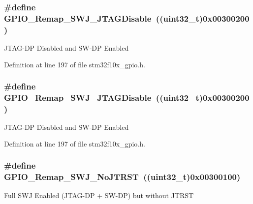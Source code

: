 \subsubsection[{\texorpdfstring{G\+P\+I\+O\+\_\+\+Remap\+\_\+\+S\+W\+J\+\_\+\+J\+T\+A\+G\+Disable}{GPIO_Remap_SWJ_JTAGDisable}}]{\setlength{\rightskip}{0pt plus 5cm}\#define G\+P\+I\+O\+\_\+\+Remap\+\_\+\+S\+W\+J\+\_\+\+J\+T\+A\+G\+Disable~(({\bf uint32\+\_\+t})0x00300200)}\hypertarget{group___g_p_i_o___remap__define_ga25fb8c789334694861444e48f486879d}{}\label{group___g_p_i_o___remap__define_ga25fb8c789334694861444e48f486879d}
J\+T\+A\+G-\/\+DP Disabled and S\+W-\/\+DP Enabled 

Definition at line 197 of file stm32f10x\+\_\+gpio.\+h.

\subsubsection[{\texorpdfstring{G\+P\+I\+O\+\_\+\+Remap\+\_\+\+S\+W\+J\+\_\+\+J\+T\+A\+G\+Disable}{GPIO_Remap_SWJ_JTAGDisable}}]{\setlength{\rightskip}{0pt plus 5cm}\#define G\+P\+I\+O\+\_\+\+Remap\+\_\+\+S\+W\+J\+\_\+\+J\+T\+A\+G\+Disable~(({\bf uint32\+\_\+t})0x00300200)}\hypertarget{group___g_p_i_o___remap__define_ga25fb8c789334694861444e48f486879d}{}\label{group___g_p_i_o___remap__define_ga25fb8c789334694861444e48f486879d}
J\+T\+A\+G-\/\+DP Disabled and S\+W-\/\+DP Enabled 

Definition at line 197 of file stm32f10x\+\_\+gpio.\+h.

\subsubsection[{\texorpdfstring{G\+P\+I\+O\+\_\+\+Remap\+\_\+\+S\+W\+J\+\_\+\+No\+J\+T\+R\+ST}{GPIO_Remap_SWJ_NoJTRST}}]{\setlength{\rightskip}{0pt plus 5cm}\#define G\+P\+I\+O\+\_\+\+Remap\+\_\+\+S\+W\+J\+\_\+\+No\+J\+T\+R\+ST~(({\bf uint32\+\_\+t})0x00300100)}\hypertarget{group___g_p_i_o___remap__define_ga81009ef35f7f039365291cf4f6fc0c5b}{}\label{group___g_p_i_o___remap__define_ga81009ef35f7f039365291cf4f6fc0c5b}
Full S\+WJ Enabled (J\+T\+A\+G-\/\+DP + S\+W-\/\+DP) but without J\+T\+R\+ST 

